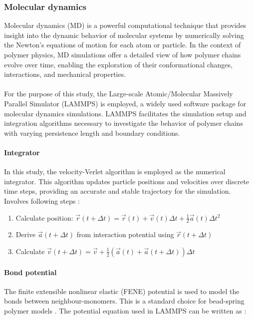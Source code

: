 \documentclass[
    paper=A4,pagesize=automedia,fontsize=12pt,
    BCOR=15mm,DIV=22,
    twoside,headinclude,footinclude=false,
    fleqn,             %
    bibliography=totocnumbered,          %
    listof=totoc,                %
    listof=flat,                 %
    cleardoublepage=empty      %
    numbers=endperiod
]{scrartcl}
\begin{document}
\subsubsection{Molecular dynamics}
Molecular dynamics (MD) is a powerful computational technique that
provides insight into the dynamic behavior of molecular systems by 
numerically solving the Newton's equations of motion for each atom or particle. 
In the context of polymer physics, MD simulations offer a detailed view of how polymer chains evolve over time, enabling the exploration of their conformational changes, interactions, and mechanical properties.
\\
\\
For the purpose of this study, the Large-scale Atomic/Molecular Massively
Parallel Simulator (LAMMPS) \cite{LAMMPS} is employed, a widely used software package 
for molecular dynamics simulations. LAMMPS facilitates the simulation setup and 
integration algorithms necessary to investigate the behavior of 
polymer chains with varying persistence length and boundary conditions.

\paragraph{Integrator}
In this study, the velocity-Verlet algorithm is employed as the numerical integrator. 
This algorithm updates particle positions and velocities over discrete time steps,
providing an accurate and stable trajectory for the simulation.
Involves following steps \cite{10.1063/1.442716}:
\begin{enumerate}
    \item Calculate position: $\vec{r}(t+\Delta t) = \vec{r}(t) + \vec{v}(t) \Delta t + \frac{1}{2} \vec{a}(t) \Delta{t}^2$
    \item Derive $\vec{a}(t+\Delta t)$ from interaction potential using $\vec{r}(t+\Delta t)$
    \item Calculate $\vec{v}(t+\Delta t) = \vec{v} + \frac{1}{2}(\vec{a}(t) + \vec{a}(t+\Delta t))\Delta t$ 
\end{enumerate}

\paragraph{Bond potential}
\label{par:bond_potential}
The finite extensible nonlinear elastic (FENE) potential \cite{Kremer_ChemPhys} 
is used to model the bonds between neighbour-monomers. This is a standard 
choice for bead-spring polymer models \cite{LAMMPS}. The potential equation used in
LAMMPS can be written as \cite{LAMMPS}:
\end{document}
